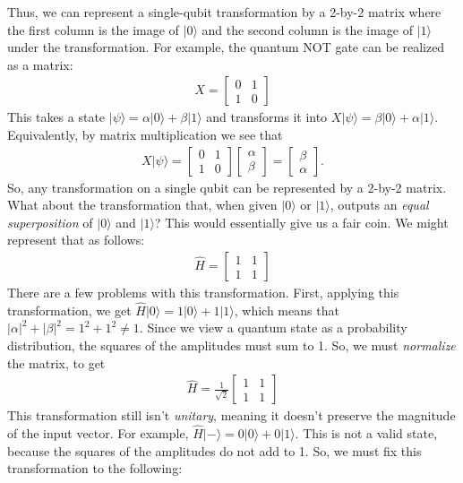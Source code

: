 \documentclass[12pt,twoside]{reedthesis}
\theoremstyle{definition}
\newcommand{\ketz}{\ensuremath{\lvert 0\rangle}\xspace}
\newcommand{\keto}{\ensuremath{\lvert 1\rangle}\xspace}
\newcommand{\ketpsi}{\ensuremath{|\psi\rangle}\xspace}
\newcommand{\Hminus}{\ensuremath{\lvert- \rangle}\xspace}
\begin{document}
Thus, we can represent a single-qubit transformation by a 2-by-2 matrix where the first column is the image of \ketz and the second column is the image of \keto under the transformation. For example, the quantum NOT gate can be realized as a matrix:
\begin{align*}
X = \begin{bmatrix}
0 & 1\\
1 & 0 
\end{bmatrix}
\end{align*}
This takes a state $\ketpsi = \alpha \ketz + \beta \keto$ and transforms it into $X \ketpsi  = \beta \ketz + \alpha \keto$. Equivalently, by matrix multiplication we see that
\begin{align*}
X \ketpsi = \begin{bmatrix}
0 & 1\\
1 & 0 
\end{bmatrix}
\begin{bmatrix}
\alpha \\
\beta
\end{bmatrix} 
= 
\begin{bmatrix}
\beta \\
\alpha
\end{bmatrix}.
\end{align*}
So, any transformation on a single qubit can be represented by a 2-by-2 matrix. What about the transformation that, when given \ketz or \keto, outputs an \textit{equal superposition} of \ketz and \keto ? This would essentially give us a fair coin. We might represent that as follows:
\begin{align*}
\widehat{H} = \begin{bmatrix}
1 & 1\\
1 & 1 
\end{bmatrix}
\end{align*}
There are a few problems with this transformation. First, applying this transformation, we get $\widehat{H} \ketz = 1\ketz + 1\keto$, which means that $\lvert \alpha \rvert ^2+ \lvert \beta \rvert ^2= 1^2 + 1^2 \neq 1.$ Since we view a quantum state as a probability distribution, the squares of the amplitudes must sum to 1. So, we must \textit{normalize} the matrix, to get 
\begin{align*}
\widehat{H} = 
\frac{1}{\sqrt{2}}
\begin{bmatrix}
1 & 1\\
1 & 1 
\end{bmatrix}
\end{align*}
This transformation still isn't \textit{unitary}, meaning it doesn't preserve the magnitude of the input vector. For example, $\widehat{H} \Hminus = 0\ketz + 0 \keto$. This is not a valid state, because the squares of the amplitudes do not add to 1. So, we must fix this transformation to the following:
\end{document}
